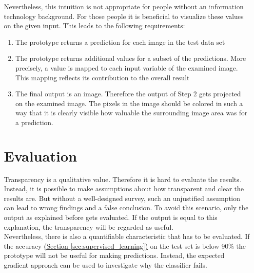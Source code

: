 Nevertheless, this intuition is not appropriate for people without an information technology background. For those people it is beneficial to visualize these values on the given input. This leads to the following requirements:

\begin{enumerate}
\item The prototype returns a prediction for each image in the test data set 
\item The prototype returns additional values for a subset of the predictions. More precisely, a value is mapped to each input variable of the examined image. This mapping reflects its contribution to the overall result
\item The final output is an image. Therefore the output of Step 2 gets projected on the examined image. The pixels in the image should be colored in such a way that it is clearly visible how valuable the surrounding image area was for a prediction.
\end{enumerate}

\section{Evaluation}

Transparency is a qualitative value. Therefore it is hard to evaluate the results. Instead, it is possible to make assumptions about how transparent and clear the results are. But without a well-designed survey, such an unjustified assumption can lead to wrong findings and a false conclusion. To avoid this scenario, only the output as explained before gets evaluated. If the output is equal to this explanation, the transparency will be regarded as useful.\\

Nevertheless, there is also a quantifiable characteristic that has to be evaluated. If the accuracy \hyperref[sec:supervised_learning]{(Section \ref{sec:supervised_learning})} on the test set is below 90\% the prototype will not be useful for making predictions. Instead, the expected gradient approach can be used to investigate why the classifier fails. 
